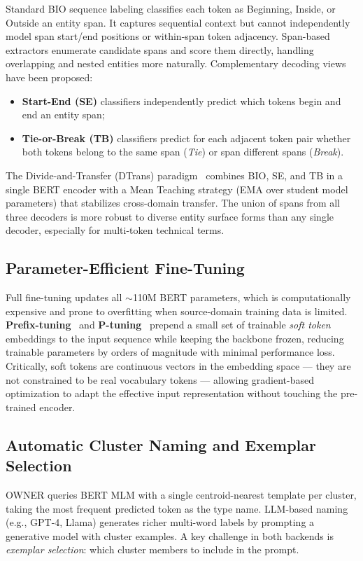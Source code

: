 \documentclass[11pt,a4paper]{article}
\begin{document}
Standard BIO sequence labeling classifies each token as Beginning, Inside, or Outside an entity span. It captures sequential context but cannot independently model span start/end positions or within-span token adjacency. Span-based extractors enumerate candidate spans and score them directly, handling overlapping and nested entities more naturally. Complementary decoding views have been proposed:
\begin{itemize}[noitemsep]
  \item \textbf{Start-End (SE)} classifiers independently predict which tokens begin and end an entity span;
  \item \textbf{Tie-or-Break (TB)} classifiers predict for each adjacent token pair whether both tokens belong to the same span (\textit{Tie}) or span different spans (\textit{Break}).
\end{itemize}

The Divide-and-Transfer (DTrans) paradigm~\cite{zhang2024} combines BIO, SE, and TB in a single BERT encoder with a Mean Teaching strategy (EMA over student model parameters) that stabilizes cross-domain transfer. The union of spans from all three decoders is more robust to diverse entity surface forms than any single decoder, especially for multi-token technical terms.

\subsection{Parameter-Efficient Fine-Tuning}

Full fine-tuning updates all $\sim$110M BERT parameters, which is computationally expensive and prone to overfitting when source-domain training data is limited. \textbf{Prefix-tuning}~\cite{li2021} and \textbf{P-tuning}~\cite{liu2022} prepend a small set of trainable \emph{soft token} embeddings to the input sequence while keeping the backbone frozen, reducing trainable parameters by orders of magnitude with minimal performance loss. Critically, soft tokens are continuous vectors in the embedding space — they are not constrained to be real vocabulary tokens — allowing gradient-based optimization to adapt the effective input representation without touching the pre-trained encoder.

\subsection{Automatic Cluster Naming and Exemplar Selection}

OWNER queries BERT MLM with a single centroid-nearest template per cluster, taking the most frequent predicted token as the type name. LLM-based naming (e.g., GPT-4, Llama) generates richer multi-word labels by prompting a generative model with cluster examples. A key challenge in both backends is \emph{exemplar selection}: which cluster members to include in the prompt.
\end{document}
